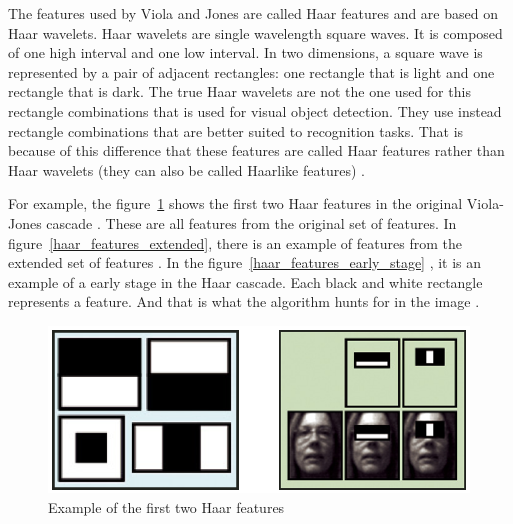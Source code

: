 \vspace{\baselineskip}
\noindent The features used by Viola and Jones are called Haar features and are based on Haar wavelets. Haar wavelets are single wavelength square waves. It is composed of one high interval and one low interval. In two dimensions, a square wave is represented by a pair of adjacent rectangles: one rectangle that is light and one rectangle that is dark. The true Haar wavelets are not the one used for this rectangle combinations that is used for visual object detection. They use instead rectangle combinations that are better suited to recognition tasks. That is because of this difference that these features are called Haar features rather than Haar wavelets (they can also be called Haarlike features) \cite{HEW07}.
\newline

\noindent For example, the figure~\ref{haar_features_first_2_stage} shows the first two Haar features in the original Viola-Jones cascade \cite{HEW07}. These are all features from the original set of features. In figure~\ref{haar_features_extended}, there is an example of features from the extended set of features \cite{DIN08}. In the figure~\ref{haar_features_early_stage} , it is an example of a early stage in the Haar cascade. Each black and white rectangle represents a feature. And that is what the algorithm hunts for in the image \cite{HAR12}.
\newline

\begin{figure}[!h]
\begin{center}
\noindent \includegraphics[scale=0.9]{figures/haar_features_first_2_stage} 
\newline
\caption{Example of the first two Haar features}
\label{haar_features_first_2_stage}
\end{center} 
\end{figure}

